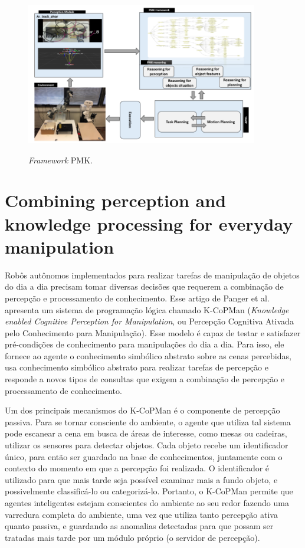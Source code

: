 \begin{figure}
    \centering
    \caption{\textit{Framework} PMK.}
    \includegraphics[width=0.9\textwidth]{images/pmk-model.png}
    \label{fig:pmk}
\end{figure}

\section{Combining perception and knowledge processing for everyday manipulation \cite{pangercic2010}}

\label{pangercic2010}
Robôs autônomos implementados para realizar tarefas de manipulação de objetos do dia a dia precisam tomar diversas decisões que requerem a combinação de percepção e processamento de conhecimento. Esse artigo de Panger et al. apresenta um sistema de programação lógica chamado K-CoPMan (\textit{Knowledge enabled Cognitive Perception for Manipulation}, ou Percepção Cognitiva Ativada pelo Conhecimento para Manipulação). Esse modelo é capaz de testar e satisfazer pré-condições de conhecimento para manipulações do dia a dia. Para isso, ele fornece ao agente o conhecimento simbólico abstrato sobre as cenas percebidas, usa conhecimento simbólico abstrato para realizar tarefas de percepção e responde a novos tipos de consultas que exigem a combinação de percepção e processamento de conhecimento.

Um dos principais mecanismos do K-CoPMan é o componente de percepção passiva. Para se tornar consciente do ambiente, o agente que utiliza tal sistema pode escanear a cena em busca de áreas de interesse, como mesas ou cadeiras, utilizar os sensores para detectar objetos. Cada objeto recebe um identificador único, para então ser guardado na base de conhecimentos, juntamente com o contexto do momento em que a percepção foi realizada. O identificador é utilizado para que mais tarde seja possível examinar mais a fundo objeto, e possivelmente classificá-lo ou categorizá-lo. Portanto, o K-CoPMan permite que agentes inteligentes estejam conscientes do ambiente ao seu redor fazendo uma varredura completa do ambiente, uma vez que utiliza tanto percepção ativa quanto passiva, e guardando as anomalias detectadas para que possam ser tratadas mais tarde por um módulo próprio (o servidor de percepção).

